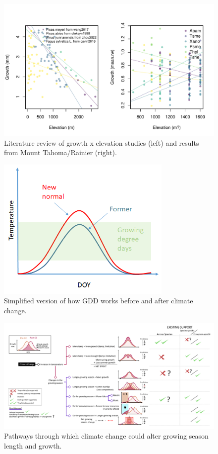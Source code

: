 \documentclass[11pt]{article}
\begin{document}
\begin{figure}[h!]
\includegraphics[width=1\textwidth]{..//analyses/growthxelevationetc/figures/growthxelev2part.pdf}
\caption{Literature review of growth x elevation studies (left) and results from Mount Tahoma/Rainier (right).}
\label{fig:gxelev}
\end{figure}


\begin{figure}[h!]
\includegraphics[width=0.75\textwidth]{..//figures/simpletempcurve_fromlucidboard.png}
\caption{Simplified version of how GDD works before and after climate change.}
\label{fig:simpletemp}
\end{figure}




\begin{figure}[h!]
\includegraphics[width=1\textwidth]{..//figures/some conceptual figure2.0.png}
\caption{Pathways through which climate change could alter growing season length and growth.}
\label{fig:pathways}
\end{figure}
\end{document}
